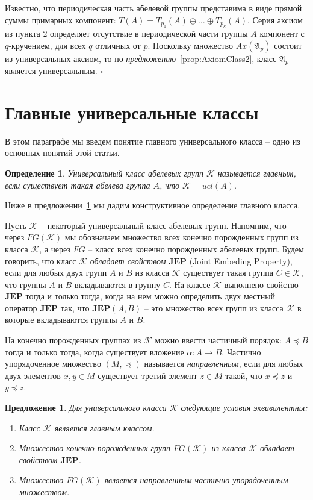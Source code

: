 \documentclass[a4paper,11pt,twoside]{article}
\newtheorem{proposition}{Предложение}[section]
\newtheorem{definition}{Определение}[section]
\def\A{{\mathfrak{A}}}
\def\K{{\mathcal{K}}}
\def\JEP{{\textbf{JEP}}}
\begin{document}
Известно, что периодическая часть абелевой группы представима в виде прямой суммы примарных компонент: $T(A) = T_{p_1}(A) \oplus \ldots \oplus T_{p_k}(A)$. Серия аксиом из пункта 2 определяет отсутствие в периодической части группы $A$ компонент с $q$-кручением, для всех $q$ отличных от $p$. Поскольку множество $Ax(\A_p)$ состоит из универсальных аксиом, то по \textit{предложению}~\ref{prop:AxiomClass2}, класс $\A_p$ является универсальным.
$\square$




\section{Главные универсальные классы}\label{sec:MainClasses}

В этом параграфе мы введем понятие главного универсального класса -- одно из основных понятий этой статьи.

\begin{definition}\label{def:MainClass}
Универсальный класс абелевых групп $\K$ называется главным, если существует такая абелева группа $A$, что $\K = ucl(A)$.
\end{definition}

Ниже в предложении~\ref{prop:DefinitionsMainClass} мы дадим конструктивное определение главного класса.

Пусть $\K$ -- некоторый универсальный класс абелевых групп. Напомним, что через $FG(\K)$ мы обозначаем множество всех конечно порожденных групп из класса $\K$, а через $FG$ -- класс всех конечно порожденных абелевых групп. Будем говорить, что класс $\K$ \textit{обладает свойством} $\JEP$ (Joint Embeding Property), если для любых двух групп $A$ и $B$ из класса $\K$ существует такая группа $C \in \K$, что группы $A$ и $B$ вкладываются в группу $C$. На классе $\K$ выполнено свойство $\JEP$ тогда и только тогда, когда на нем можно определить двух местный оператор $\JEP$ так, что $\JEP(A, B)$ -- это множество всех групп из класса $\K$ в которые вкладываются группы $A$ и $B$.

На конечно порожденных группах из $\K$ можно ввести частичный порядок: $A \preceq B$ тогда и только тогда, когда существует вложение $\alpha: A \rightarrow B$. Частично упорядоченное множество $(M, \preceq)$ называется \textit{направленным}, если для любых двух элементов $x, y \in M$ существует третий элемент $z \in M$ такой, что $x \preceq z$ и $y \preceq z$. 


\begin{proposition}\label{prop:DefinitionsMainClass}
Для универсального класса $\K$ следующие условия эквивалентны:
\begin{enumerate}
\item Класс $\K$ является главным классом.
\item Множество конечно порожденных групп $FG(\K)$ из класса $\K$ обладает свойством $\JEP$.
\item Множество $FG(\K)$ является направленным частично упорядоченным множеством.
\end{enumerate}
\end{proposition}
\end{document}
